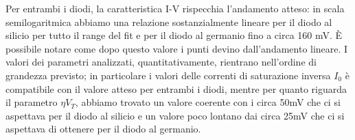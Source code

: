 Per entrambi i diodi, la caratteristica I-V rispecchia l’andamento atteso: in scala semilogaritmica abbiamo una relazione sostanzialmente lineare per il diodo al silicio per tutto il range del fit e per il diodo al germanio fino a circa 160 \si{\milli\volt}. È possibile notare come dopo questo valore i punti devino dall'andamento lineare. I valori dei parametri analizzati, quantitativamente, rientrano nell’ordine di grandezza previsto; in particolare i valori delle correnti di saturazione inversa $I_0$ è compatibile con il valore atteso per entrambi i diodi, mentre per quanto riguarda il parametro $\eta V_T$, abbiamo trovato un valore coerente con i circa 50\si{\milli\volt} che ci si aspettava per il diodo al silicio e un valore poco lontano dai circa 25\si{\milli\volt} che ci si aspettava di ottenere per il diodo al germanio.
